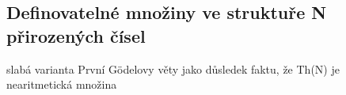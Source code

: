 

\subsection{Definovatelné množiny ve struktuře N přirozených čísel}
slabá varianta První Gödelovy věty jako důsledek faktu, že Th(N) je nearitmetická množina

